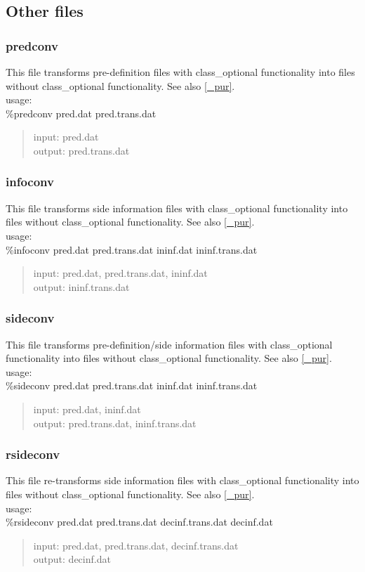 \documentclass[a4paper]{article}
\begin{document}
\subsection{Other files}

\subsubsection{predconv}
This file transforms pre-definition files with class\_optional functionality into files without class\_optional functionality. See also \ref{_pur}.\\
usage: \\
\%predconv pred.dat pred.trans.dat
\begin{quote}
  input: pred.dat\\
  output: pred.trans.dat
\end{quote}

\subsubsection{infoconv}
This file transforms side information files with class\_optional functionality into files without class\_optional functionality. See also \ref{_pur}.\\
usage: \\
\%infoconv pred.dat pred.trans.dat ininf.dat ininf.trans.dat
\begin{quote}
  input: pred.dat, pred.trans.dat, ininf.dat\\
  output: ininf.trans.dat
\end{quote}

\subsubsection{sideconv}
This file transforms pre-definition/side information files with class\_optional functionality into files without class\_optional functionality. See also \ref{_pur}.\\
usage: \\
\%sideconv pred.dat pred.trans.dat ininf.dat ininf.trans.dat
\begin{quote}
  input: pred.dat, ininf.dat\\
  output: pred.trans.dat, ininf.trans.dat
\end{quote}

\subsubsection{rsideconv \label{rsideconv}}
This file re-transforms side information files with class\_optional functionality into files without class\_optional functionality. See also \ref{_pur}.\\
usage: \\
\%rsideconv pred.dat pred.trans.dat decinf.trans.dat decinf.dat
\begin{quote}
  input: pred.dat, pred.trans.dat, decinf.trans.dat\\
  output: decinf.dat
\end{quote}
   
\end{document}
